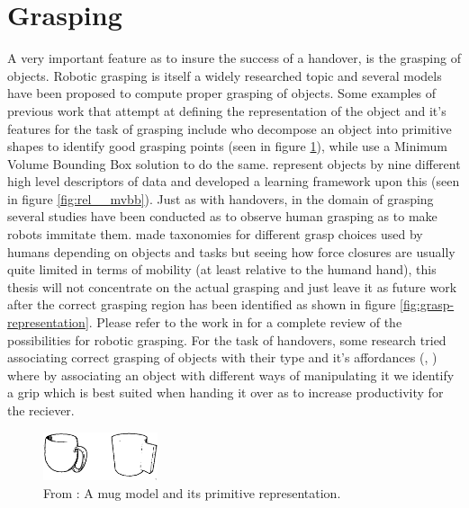 \section{Grasping}
A very important feature as to insure the success of a handover, is the grasping of objects. Robotic grasping is itself a widely researched topic and several models have been proposed to compute proper grasping of objects. Some examples of previous work that attempt at defining the representation of the object and it's features for the task of grasping include \textcite{Miller2003} who decompose an object into primitive shapes to identify good grasping points (seen in figure \ref{fig:rel__shape-primitives}), while \textcite{Huebner2008} use a Minimum Volume Bounding Box solution to do the same. \textcite{Morales} represent objects by nine different high level descriptors of data and developed a learning framework upon this (seen in figure \ref{fig:rel__mvbb}). Just as with handovers, in the domain of grasping several studies have been conducted as to observe human grasping as to make robots immitate them. \parencite{Cutkosky1990} \parencite{Feix2009} \parencite{Kang1993} made taxonomies for different grasp choices used by humans depending on objects and tasks but seeing how force closures are usually quite limited in terms of mobility (at least relative to the humand hand), this thesis will not concentrate on the actual grasping and just leave it as future work after the correct grasping region has been identified as shown in figure \ref{fig:grasp-representation}. Please refer to the work in \parencite{Sahbani2012} for a complete review of the possibilities for robotic grasping. For the task of handovers, some research tried associating correct grasping of objects with their type and it's affordances (\parencite{Song2015}, \parencite{Chan2014}) where by associating an object with different ways of manipulating it we identify a grip which is best suited when handing it over as to increase productivity for the reciever.

\begin{figure}
	\centering
	\includegraphics[width=0.3\textwidth]{img/related-work/shape-primitives.png}
	\caption{From \parencite{Miller2003}: A mug model and its primitive representation.}
	\label{fig:rel__shape-primitives}
\end{figure}

